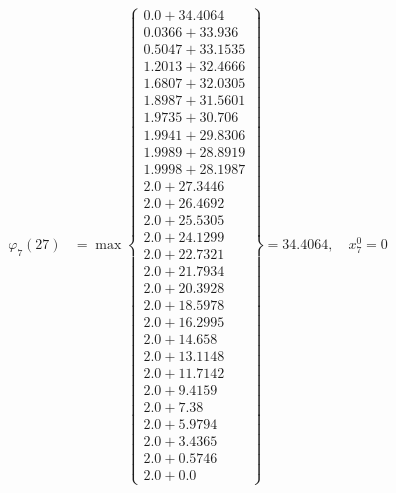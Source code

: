 \documentclass{article}
\begin{document}
\begin{align*}
\varphi_{7}(27) &= \max \left\{ \begin{array}{c}
0.0 + 34.4064 \\
 0.0366 + 33.936 \\
 0.5047 + 33.1535 \\
 1.2013 + 32.4666 \\
 1.6807 + 32.0305 \\
 1.8987 + 31.5601 \\
 1.9735 + 30.706 \\
 1.9941 + 29.8306 \\
 1.9989 + 28.8919 \\
 1.9998 + 28.1987 \\
 2.0 + 27.3446 \\
 2.0 + 26.4692 \\
 2.0 + 25.5305 \\
 2.0 + 24.1299 \\
 2.0 + 22.7321 \\
 2.0 + 21.7934 \\
 2.0 + 20.3928 \\
 2.0 + 18.5978 \\
 2.0 + 16.2995 \\
 2.0 + 14.658 \\
 2.0 + 13.1148 \\
 2.0 + 11.7142 \\
 2.0 + 9.4159 \\
 2.0 + 7.38 \\
 2.0 + 5.9794 \\
 2.0 + 3.4365 \\
 2.0 + 0.5746 \\
 2.0 + 0.0
\end{array} \right\}=34.4064, \quad x_{7}^0=0\\
  

\end{align*}
\end{document}

